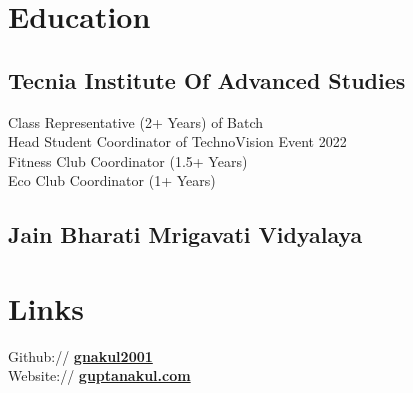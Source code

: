 \documentclass[]{deedy-resume-openfont}
\begin{document}
\begin{minipage}[t]{0.4\textwidth}
\section{Education} 

\subsection{Tecnia Institute Of Advanced Studies}
Class Representative (2+ Years) of Batch\\
Head Student Coordinator of TechnoVision Event 2022\\
Fitness Club Coordinator (1.5+ Years)\\
Eco Club Coordinator (1+ Years)\\
\sectionsep

\subsection{Jain Bharati Mrigavati Vidyalaya}
\sectionsep





\section{Links} 
Github:// \href{https://github.com/gnakul2001}{\bf gnakul2001} \\
Website://  \href{https://guptanakul.com}{\bf guptanakul.com} \\
\sectionsep


\end{minipage}
\end{document}
